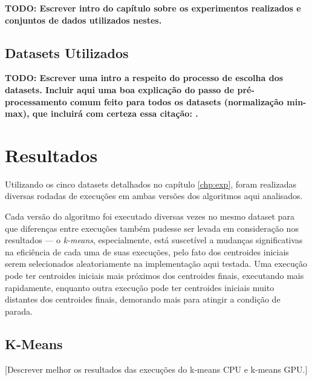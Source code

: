 \documentclass[12pt,
openright, 
oneside, %
a4paper,    %
brazil]{facom-ufu-abntex2}
\begin{document}

\textbf{TODO: Escrever intro do capítulo sobre os experimentos realizados e conjuntos de dados utilizados nestes.}




\section{Datasets Utilizados}
\label{sec:datasets}

\textbf{TODO: Escrever uma intro a respeito do processo de escolha dos datasets. Incluir aqui uma boa explicação do passo de pré-processamento comum feito para todos os datasets (normalização min-max), que incluirá com certeza essa citação: \cite{standardizOfVars1988}.}






\chapter{Resultados}

Utilizando os cinco datasets detalhados no capítulo \ref{chp:exp}, foram realizadas diversas rodadas de execuções em ambas versões dos algoritmos aqui analisados.

Cada versão do algoritmo foi executado diversas vezes no mesmo dataset para que diferenças entre execuções também pudesse ser levada em consideração nos resultados — o \textit{k-means}, especialmente, está suscetível a mudanças significativas na eficiência de cada uma de suas execuções, pelo fato dos centroides iniciais serem selecionados aleatoriamente na implementação aqui testada. Uma execução pode ter centroides iniciais mais próximos dos centroides finais, executando mais rapidamente, enquanto outra execução pode ter centroides iniciais muito distantes dos centroides finais, demorando mais para atingir a condição de parada.




\section{K-Means}

[Descrever melhor os resultados das execuções do k-means CPU e k-means GPU.]
\end{document}
